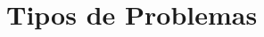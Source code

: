 \documentclass[
	12pt,				%
	openright,			%
	oneside,			%
	a4paper,			%
	english,			%
	brazil,				%
	]{abntex2}
\begin{document}











\section{Tipos de Problemas}
\end{document}
